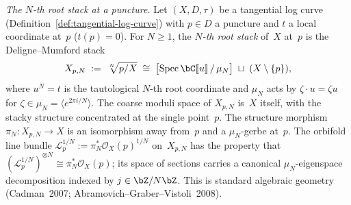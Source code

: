 \emph{The $N$-th root stack at a puncture.}%
\ClaimStatusProvedHere{}
Let $(X, D, \tau)$ be a tangential log curve
(Definition~\ref{def:tangential-log-curve}) with
$p \in D$ a puncture and $t$ a local coordinate at~$p$
($t(p) = 0$). For $N \geq 1$, the \emph{$N$-th root
stack} of~$X$ at~$p$ is the Deligne--Mumford stack
\begin{equation}\label{eq:root-stack-def}
X_{p,N}
\;:=\;
\sqrt[N]{p/X}
\;\cong\;
\bigl[\operatorname{Spec}\bC[\![u]\!] \,/\, \mu_N\bigr]
\;\sqcup\;
(X \setminus \{p\}),
\end{equation}
where $u^N = t$ is the tautological $N$-th root
coordinate and $\mu_N$ acts by
$\zeta \cdot u = \zeta u$ for
$\zeta \in \mu_N = \langle e^{2\pi i/N}\rangle$.
The coarse moduli space of $X_{p,N}$ is~$X$ itself,
with the stacky structure concentrated at the single
point~$p$. The structure morphism
$\pi_N \colon X_{p,N} \to X$
is an isomorphism away from~$p$ and a
$\mu_N$-gerbe at~$p$. The orbifold line bundle
$\mathcal{L}_p^{1/N} := \pi_N^* \mathcal{O}_X(p)^{1/N}$
on~$X_{p,N}$ has the property that
$(\mathcal{L}_p^{1/N})^{\otimes N} \cong
\pi_N^* \mathcal{O}_X(p)$;
its space of sections carries a canonical
$\mu_N$-eigenspace decomposition indexed by
$j \in \bZ/N\bZ$.
This is standard algebraic geometry
(Cadman~2007;
Abramovich--Graber--Vistoli~2008).

